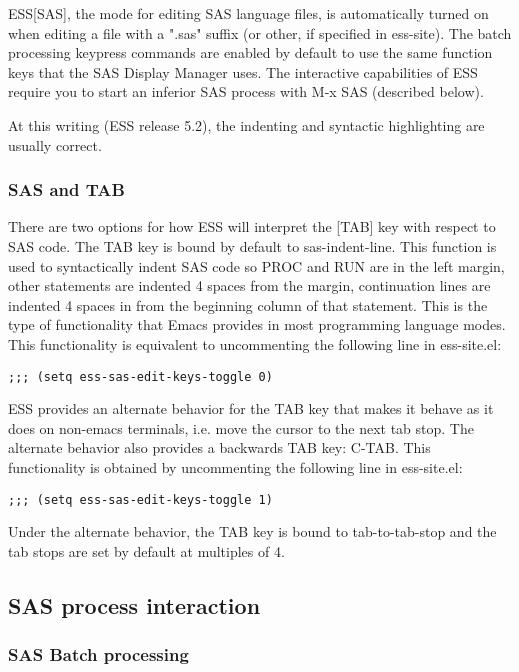 \documentclass{article}
\begin{document}
ESS[SAS], the mode for editing SAS language files, is automatically
turned on when editing a file with a ".sas" suffix (or other, if
specified in ess-site).  The batch processing keypress commands are
enabled by default to use the same function keys that the SAS Display
Manager uses.  The interactive capabilities of ESS require you to
start an inferior SAS process with M-x SAS (described below).

At this writing (ESS release 5.2), the indenting and syntactic
highlighting are usually correct.


\subsubsection{SAS and TAB}
\label{sec:SAS:tab}

There are two options for how ESS will interpret the [TAB] key with
respect to SAS code.  The TAB key is bound by default to
sas-indent-line.  This function is used to syntactically indent SAS
code so PROC and RUN are in the left margin, other statements are
indented 4 spaces from the margin, continuation lines are indented 4
spaces in from the beginning column of that statement.  This is the
type of functionality that Emacs provides in most programming language
modes.  This functionality is equivalent to uncommenting the following
line in ess-site.el:
\begin{verbatim}
;;; (setq ess-sas-edit-keys-toggle 0)
\end{verbatim}

ESS provides an alternate behavior for the TAB key that makes it
behave as it does on non-emacs terminals, i.e. move the cursor to the
next tab stop.  The alternate behavior also provides a backwards TAB
key: C-TAB.  This functionality is obtained by uncommenting the
following line in ess-site.el:
\begin{verbatim}
;;; (setq ess-sas-edit-keys-toggle 1)
\end{verbatim}
Under the alternate behavior, the TAB key is bound to tab-to-tab-stop
and the tab stops are set by default at multiples of 4.


\subsection{SAS process interaction}
\label{sec:SAS:proc}


\subsubsection{SAS Batch processing}
\label{sec:SAS:proc:batch}
\end{document}
